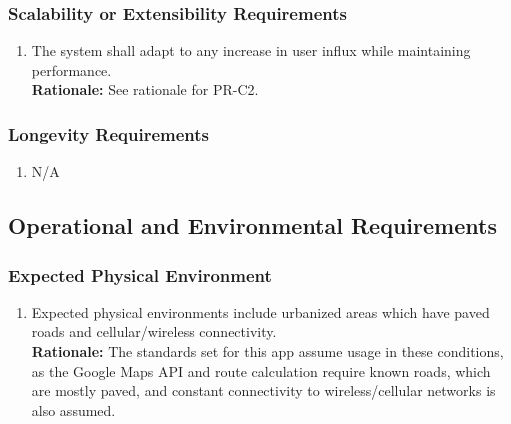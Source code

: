 \documentclass[]{article}
\begin{document}
\subsubsection{Scalability or Extensibility Requirements}
\label{ssub:scalability_or_extensibility_requirements}
\begin{enumerate}[{PR-SE}1. ]
	\item The system shall adapt to any increase in user influx while maintaining performance.\\
	{\bf Rationale:} See rationale for PR-C2.
\end{enumerate}

\subsubsection{Longevity Requirements}
\label{ssub:longevity_requirements}
\begin{enumerate}[{PR-L}1. ]
	\item N/A
\end{enumerate}


\subsection{Operational and Environmental Requirements}
\label{sub:operational_and_environmental_requirements}

\subsubsection{Expected Physical Environment}
\label{ssub:expected_physical_environment}
\begin{enumerate}[{OE-EPE}1. ]
	\item Expected physical environments include urbanized areas which have paved roads and cellular/wireless connectivity.\\
	{\bf Rationale:} The standards set for this app assume usage in these conditions, as the Google Maps API and route calculation require known roads, which are mostly paved, and constant connectivity to wireless/cellular networks is also assumed. 
\end{enumerate}
\end{document}

